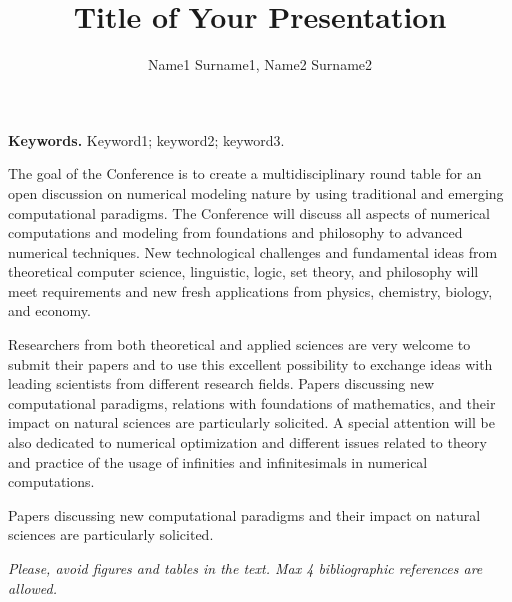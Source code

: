 \documentclass[oribibl]{llncs}
\begin{document}
\cleardoublepage

\title{Title of Your Presentation}
\author{Name1 Surname1, Name2 Surname2}



\maketitle

\thispagestyle{fancy}

\textbf{Keywords.} Keyword1; keyword2; keyword3.

 \vspace*{0.5cm}


The goal of the Conference is to create a multidisciplinary round
table for an open discussion on numerical modeling nature by using
traditional and emerging computational paradigms. The Conference
will discuss all aspects of numerical computations and modeling from
foundations and philosophy to advanced numerical techniques. New
technological challenges and fundamental ideas from theoretical
computer science, linguistic, logic, set theory, and philosophy will
meet requirements and new fresh applications from physics,
chemistry, biology, and economy.

Researchers from both theoretical and applied sciences are very
welcome to submit their papers and to use this excellent possibility
to exchange ideas with leading scientists from different research
fields. Papers discussing new computational paradigms, relations
with foundations of mathematics, and their impact on natural
sciences are particularly solicited. A special attention will be
also dedicated to numerical optimization and different issues
related to theory and practice of the usage of infinities and
infinitesimals in numerical computations.

Papers discussing new computational paradigms and their impact on
natural sciences are particularly solicited.

\textit{Please, avoid figures and tables in the text. Max 4
bibliographic references are allowed.}
\end{document}
